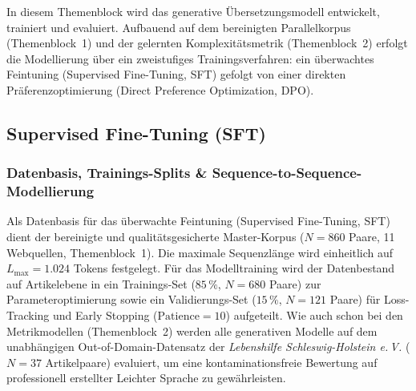 In diesem Themenblock wird das generative Übersetzungsmodell entwickelt, trainiert und evaluiert. Aufbauend auf dem bereinigten Parallelkorpus (Themenblock~1) und der gelernten Komplexitätsmetrik (Themenblock~2) erfolgt die Modellierung über ein zweistufiges Trainingsverfahren: ein überwachtes Feintuning (Supervised Fine-Tuning, SFT) gefolgt von einer direkten Präferenzoptimierung (Direct Preference Optimization, DPO).

\subsection{Supervised Fine-Tuning (SFT)}
\label{sec:sft_training}
\label{sec:daten_splits_dpo}

\subsubsection{Datenbasis, Trainings-Splits \& Sequence-to-Sequence-Modellierung}
\label{sec:sft_korpus_filterung}
\label{sec:split_konfiguration_anti_contamination}
\label{sec:sft_seq2seq}

Als Datenbasis für das überwachte Feintuning (Supervised Fine-Tuning, SFT) dient der bereinigte und qualitätsgesicherte Master-Korpus ($N = 860$ Paare, 11 Webquellen, Themenblock~1). Die maximale Sequenzlänge wird einheitlich auf $L_{\max} = 1.024$ Tokens festgelegt. Für das Modelltraining wird der Datenbestand auf Artikelebene in ein Trainings-Set ($85\,\%$, $N = 680$ Paare) zur Parameteroptimierung sowie ein Validierungs-Set ($15\,\%$, $N = 121$ Paare) für Loss-Tracking und Early Stopping ($\text{Patience} = 10$) aufgeteilt. Wie auch schon bei den Metrikmodellen (Themenblock~2) werden alle generativen Modelle auf dem unabhängigen Out-of-Domain-Datensatz der \textit{Lebenshilfe Schleswig-Holstein e.\,V.} ($N = 37$ Artikelpaare) evaluiert, um eine kontaminationsfreie Bewertung auf professionell erstellter Leichter Sprache zu gewährleisten.


